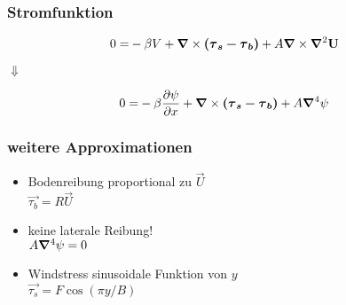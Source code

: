 \begin{frame}
\frametitle{Stromfunktion}
\begin{align}
		0
	=& -\beta V  + \mathbf{\bm{\nabla}} \times \mathbf{\bm{\left( \mathbf{\tau}_{s}- \mathbf{\tau}_{b} \right)}}  + A  \mathbf{\bm{\nabla}} \times \mathbf{\bm{\nabla}}^{2} \mathbf{\bm{U}}    \nonumber 
\end{align}
\begin{center}
	$\Downarrow$
\end{center}
\begin{align}
		0
	=& -\beta \frac{\partial\psi}{\partial x}  + \mathbf{\bm{\nabla}} \times \mathbf{\bm{\left( \mathbf{\tau}_{s}- \mathbf{\tau}_{b} \right)}}  + A  \mathbf{\bm{\nabla}}^{4} \psi  
\end{align}
\end{frame}

\begin{frame}
\frametitle{weitere Approximationen}
\begin{itemize}
	\item<1-> 
	Bodenreibung proportional zu $\vec{U}$ \\
	$\vec{\tau_b} = R \vec{U}$
	\item<2->
	keine laterale Reibung! \\
	$A  \mathbf{\bm{\nabla}}^{4} \psi  = 0 $
	\item<3->
	Windstress sinusoidale Funktion von $y$ \\
	$\vec{\tau_s} = F \cos{(\pi y / B)}$	
\end{itemize}
\end{frame}

